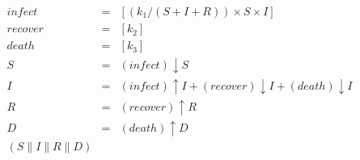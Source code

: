 %
\begin{eqnarray*}
\mathit{infect} & = & [(k_1/(S+I+R))\times S\times I]\\%
\mathit{recover} & = & [k_2]\\%
\mathit{death} & = & [k_3]\\%
%
S & = & (\mathit{infect}){\downarrow}S\\%
I & = & (\mathit{infect}){\uparrow}I + (\mathit{recover}){\downarrow}I + (\mathit{death}){\downarrow}I\\%
R & = & (\mathit{recover}){\uparrow}R\\%
D & = & (\mathit{death}){\uparrow}D\\%
%
(S {\parallel} I {\parallel} R {\parallel} D)\end{eqnarray*}
